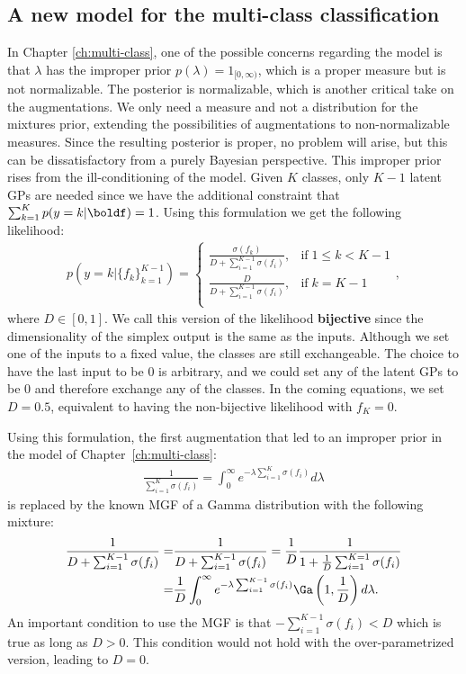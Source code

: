 \subsection{A new model for the multi-class classification}
\label{sec:simplex}
In Chapter \ref{ch:multi-class}, one of the possible concerns regarding the model is that $\lambda$ has the improper prior $p(\lambda) = 1_{[0,\infty)}$, which is a proper measure but is not normalizable.
The posterior is normalizable, which is another critical take on the augmentations.
We only need a measure and not a distribution for the mixtures prior, 
extending the possibilities of augmentations to non-normalizable measures.
Since the resulting posterior is proper, no problem will arise, but this can be dissatisfactory from a purely Bayesian perspective.
This improper prior rises from the ill-conditioning of the model.
Given $K$ classes, only $K-1$ latent \ac{GPs} are needed since we have the additional constraint that $\sum_{k=1}^K p(y=k|\boldf) = 1$.
Using this formulation we get the following likelihood:
\begin{align}
    p(y=k|\{f_k\}_{k=1}^{K-1}) = \left\{
        \begin{array}{cc}
            \frac{\sigma(f_k)}{D + \sum_{i=1}^{K-1}\sigma(f_i)}, & \mathrm{if}\; 1 \leq k < K - 1\\
            \frac{D}{D + \sum_{i=1}^{K-1}\sigma(f_i)}, & \mathrm{if}\; k = K - 1 \\
    \end{array}
    \right.,
\end{align}
where $D \in [0, 1]$.
We call this version of the likelihood \textbf{bijective} since the dimensionality of the simplex output is the same as the inputs.
Although we set one of the inputs to a fixed value, the classes are still exchangeable.
The choice to have the last input to be $0$ is arbitrary, and we could set any of the latent \ac{GPs} to be $0$ and therefore exchange any of the classes.
In the coming equations, we set $D=0.5$, equivalent to having the non-bijective likelihood with $f_K = 0$.

Using this formulation, the first augmentation that led to an improper prior in the model of Chapter~\ref{ch:multi-class}:
\begin{align*}
    \frac{1}{ \sum_{i=1}^{K} \sigma(f_i)} = \int_0^\infty e^{-\lambda  \sum_{i=1}^{K} \sigma(f_i)}d\lambda
\end{align*}
is replaced by the known \ac{MGF} of a Gamma distribution with the following mixture:
\begin{align*}
    \frac{1}{D + \sum_{i=1}^{K-1} \sigma(f_i)} =& \frac{1}{D + \sum_{i=1}^{K-1} \sigma(f_i)} = \frac{1}{D}\frac{1}{1+\frac{1}{D}\sum_{i=1}^{K=1}\sigma(f_i)}\\
    =& \frac{1}{D}\int_0^\infty e^{-\lambda \sum_{i=1}^{K-1} \sigma(f_i)}\Ga \left(1, \frac{1}{D}\right)d\lambda.
\end{align*}
An important condition to use the \ac{MGF} is that $-\sum_{i=1}^{K-1} \sigma(f_i) < D$ which is true as long as $D > 0$.
This condition would not hold with the over-parametrized version, leading to $D=0$.

